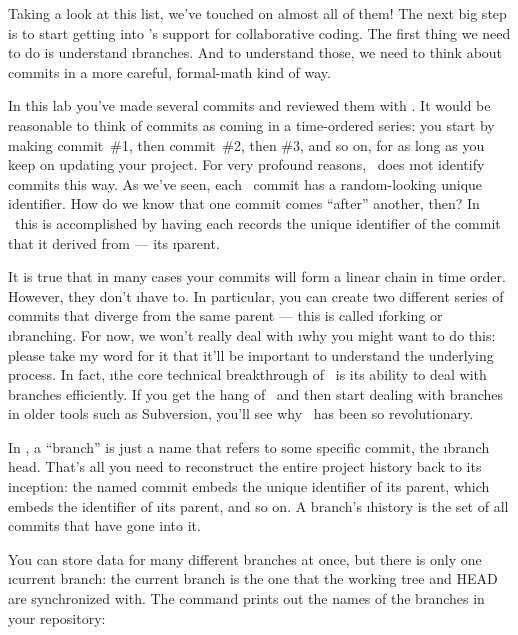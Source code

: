 \documentclass[letterpaper, 12pt, titlepage, twoside]{article}
\begin{document}

Taking a look at this list, we've touched on almost all of them! The next big
step is to start getting into \git's support for collaborative coding. The
first thing we need to do is understand \i{branches}. And to understand those,
we need to think about commits in a more careful, formal-math kind of way.

In this lab you've made several commits and reviewed them with . It
would be reasonable to think of commits as coming in a time-ordered series:
you start by making commit~\#1, then commit~\#2, then \#3, and so on, for as
long as you keep on updating your project. For very profound reasons,
\git\ does \i{not} identify commits this way. As we've seen, each \git\ commit
has a random-looking unique identifier. How do we know that one commit comes
``after'' another, then? In \git\ this is accomplished by having each records
the unique identifier of the commit that it derived from --- its \i{parent}.


It is true that in many cases your commits will form a linear chain in time
order. However, they don't \i{have} to. In particular, you can create two
different series of commits that diverge from the same parent --- this is
called \i{forking} or \i{branching}. For now, we won't really deal with
\i{why} you might want to do this: please take my word for it that it'll be
important to understand the underlying process. In fact, \i{the core technical
  breakthrough of \git\ is its ability to deal with branches efficiently.} If
you get the hang of \git\ and then start dealing with branches in older tools
such as Subversion, you'll see why \git\ has been so revolutionary.

In \git, a ``branch'' is just a name that refers to some specific commit, the
\i{branch head}. That's all you need to reconstruct the entire project history
back to its inception: the named commit embeds the unique identifier of its
parent, which embeds the identifier of \i{its} parent, and so on. A branch's
\i{history} is the set of all commits that have gone into it.

You can store data for many different branches at once, but there is only one
\i{current branch}: the current branch is the one that the working tree and
HEAD are synchronized with. The  command prints out the names of
the branches in your repository:
\end{document}
